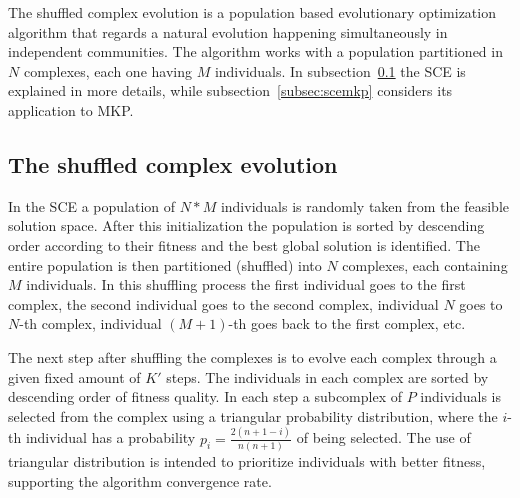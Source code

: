 

The shuffled complex evolution is a population
based evolutionary optimization algorithm that regards a natural 
evolution happening simultaneously in independent communities.
The algorithm works with a population partitioned in $N$ complexes, each one
having $M$ individuals.
In subsection~\ref{subsec:sce} the SCE is explained in more details,
while subsection~\ref{subsec:scemkp} considers its application to MKP.


\subsection{The shuffled complex evolution}
\label{subsec:sce}
In the SCE a population of $N*M$ individuals is randomly taken from the
feasible solution space.
After this initialization the population is sorted by descending order according
to their fitness and the best global solution is identified.
The entire population is then partitioned (shuffled) into $N$ complexes,
each containing $M$ individuals.
In this shuffling process the first individual goes to the first complex, the second
individual goes to the second complex, individual $N$ goes to $N$-th complex,
individual $(M+1)$-th goes back to the first complex, etc.

The next step after shuffling the complexes is to evolve each complex through
a given fixed amount of $K'$ steps.
The individuals in each complex are sorted by descending order of fitness quality.
In each step a subcomplex of $P$ individuals is selected from the
complex using a triangular probability distribution, where the $i$-th individual
has a probability $p_i = \frac{2(n+1-i)}{n(n+1)}$ of being selected.
The use of triangular distribution is intended to prioritize individuals with
better fitness, supporting the algorithm convergence rate.


